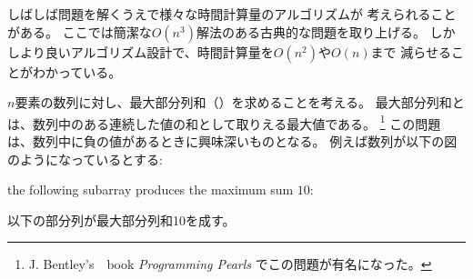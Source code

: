しばしば問題を解くうえで様々な時間計算量のアルゴリズムが
考えられることがある。
ここでは簡潔な$O(n^3)$解法のある古典的な問題を取り上げる。
しかしより良いアルゴリズム設計で、時間計算量を$O(n^2)$や$O(n)$まで
減らせることがわかっている。

\begin{comment}
Given an array of $n$ numbers,
our task is to calculate the
\key{maximum subarray sum}, i.e.,
the largest possible sum of 
a sequence of consecutive values
in the array\footnote{J. Bentley's
book \emph{Programming Pearls} \cite{ben86} made the problem popular.}.
The problem is interesting when there may be
negative values in the array.
For example, in the array
\end{comment}

$n$要素の数列に対し、最大部分列和（）を求めることを考える。
最大部分列和とは、数列中のある連続した値の和として取りえる最大値である。
\footnote{J. Bentley's　book \emph{Programming Pearls} \cite{ben86} でこの問題が有名になった。}
この問題は、数列中に負の値があるときに興味深いものとなる。
例えば数列が以下の図のようになっているとする:
\begin{center}
\end{center}
\begin{samepage}
\begin{comment}
\end{comment}
the following subarray produces the maximum sum $10$:
\begin{center}
以下の部分列が最大部分列和10を成す。

\end{center}
\end{samepage}

